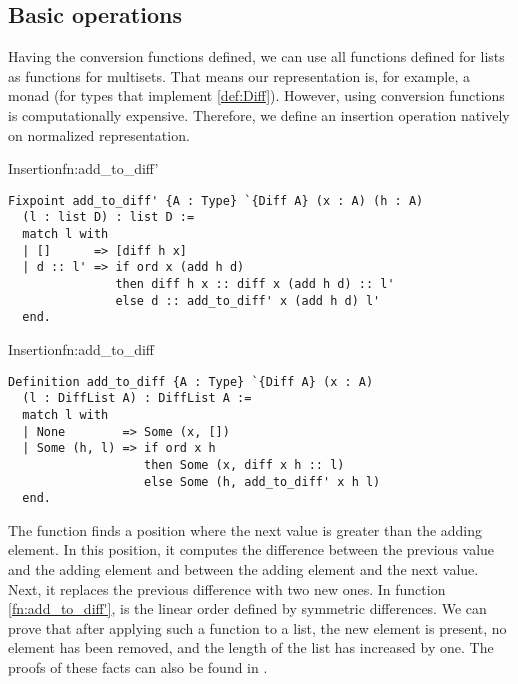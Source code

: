 \subsection{Basic operations}
Having the conversion functions defined, we can use all functions defined for lists as functions for multisets. That means our representation is, for example, a monad (for types that implement \ref{def:Diff}). However, using conversion functions is computationally expensive. Therefore, we define an insertion operation natively on normalized representation.
\begin{func}{Insertion}{fn:add_to_diff'}
\begin{verbatim}
Fixpoint add_to_diff' {A : Type} `{Diff A} (x : A) (h : A) 
  (l : list D) : list D :=
  match l with
  | []      => [diff h x]
  | d :: l' => if ord x (add h d)
               then diff h x :: diff x (add h d) :: l'
               else d :: add_to_diff' x (add h d) l'
  end.
\end{verbatim}
\end{func}
\begin{func}{Insertion}{fn:add_to_diff}
\begin{verbatim}
Definition add_to_diff {A : Type} `{Diff A} (x : A) 
  (l : DiffList A) : DiffList A :=
  match l with
  | None        => Some (x, [])
  | Some (h, l) => if ord x h
                   then Some (x, diff x h :: l)
                   else Some (h, add_to_diff' x h l)
  end.
\end{verbatim}
\end{func}
The function  finds a position where the next value is greater than the adding element. In this position, it computes the difference between the previous value and the adding element and between the adding element and the next value. Next, it replaces the previous difference with two new ones. In function \ref{fn:add_to_diff'},  is the linear order defined by symmetric differences. We can prove that after applying such a function to a list, the new element is present, no element has been removed, and the length of the list has increased by one. The proofs of these facts can also be found in .
